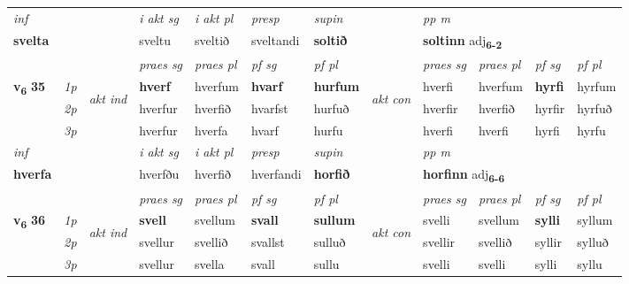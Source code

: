\begin{longtable}[l]{X>{\footnotesize\itshape}llXXXXlXXXX}
   {\textit{inf}} & &  & \textit{i akt sg} & \textit{i akt pl}   & \textit{presp} & \textit{supin}  && \textit{pp m} \\*
  {\textbf{svelta}} & && sveltu  & sveltið   & sveltandi &  \textbf{soltið}  && \multicolumn{2}{l}{\textbf{soltinn} adj\textbf{\textsubscript{6-2}}} \\*

\midrule

 & &   & \textit{praes sg}  & \textit{praes pl}    & \textit{ pf sg} & \textit{pf pl} & & \textit{praes sg}  & \textit{praes pl}    & \textit{pf sg} & \textit{pf pl }  \\ \cmidrule{4-7} \cmidrule{9-12}
 \multirow{2}{*}{{{\textbf{v{\textsubscript{6}}} \Large{\textbf{35}}}}}  & 1p & \multirow{3}{*}{\begin{turn}{90}\textit{akt ind}\end{turn}} & \textbf{hverf} & hverfum & \textbf{hvarf} & \textbf{hurfum} & \multirow{3}{*}{\begin{turn}{90}\textit{akt con}\end{turn}} &hverfi & hverfum & \textbf{hyrfi} & hyrfum\\*
 & 2p &  &  hverfur  & hverfið & hvarfst & hurfuð & & hverfir & hverfið & hyrfir & hyrfuð \\*
 & 3p &  & hverfur & hverfa & hvarf & hurfu & & hverfi & hverfi& hyrfi & hyrfu \\*
\cmidrule{4-7} \cmidrule{9-12}

   {\textit{inf}} & &  & \textit{i akt sg} & \textit{i akt pl}   & \textit{presp} & \textit{supin}  && \textit{pp m} \\*
  {\textbf{hverfa}} & && hverfðu  & hverfið   & hverfandi &  \textbf{horfið}  && \multicolumn{2}{l}{\textbf{horfinn} adj\textbf{\textsubscript{6-6}}} \\*

\midrule

 & &   & \textit{praes sg}  & \textit{praes pl}    & \textit{ pf sg} & \textit{pf pl} & & \textit{praes sg}  & \textit{praes pl}    & \textit{pf sg} & \textit{pf pl }  \\ \cmidrule{4-7} \cmidrule{9-12}
 \multirow{2}{*}{{{\textbf{v{\textsubscript{6}}} \Large{\textbf{36}}}}}  & 1p & \multirow{3}{*}{\begin{turn}{90}\textit{akt ind}\end{turn}} & \textbf{svell} & svellum & \textbf{svall} & \textbf{sullum} & \multirow{3}{*}{\begin{turn}{90}\textit{akt con}\end{turn}} &svelli & svellum & \textbf{sylli} & syllum\\*
 & 2p &  &  svellur  & svellið & svallst & sulluð & & svellir & svellið & syllir & sylluð \\*
 & 3p &  & svellur & svella & svall & sullu & & svelli & svelli& sylli & syllu \\*
\cmidrule{4-7} \cmidrule{9-12}


\end{longtable}
